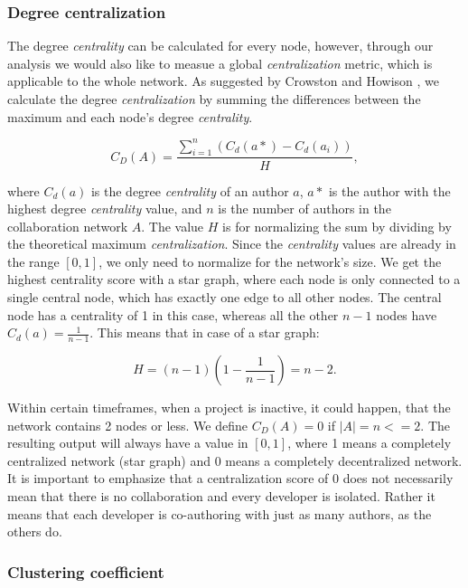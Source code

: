 \subsubsection{Degree centralization}

The degree \textit{centrality} can be calculated for every node, however, through our analysis we would also like to measue a global \textit{centralization} metric, which is applicable to the whole network. As suggested by Crowston and Howison \cite{crowstonHierarchyCentralizationFree2006}, we calculate the degree \textit{centralization} by summing the differences between the maximum and each node's degree \textit{centrality}. 

\[ C_D(A) = \frac{\sum_{i=1}^n(C_d(a*)-C_d(a_i))}{H}, \]

where $C_d(a)$ is the degree \textit{centrality} of an author $a$, $a*$ is the author with the highest degree \textit{centrality} value, and $n$ is the number of authors in the collaboration network $A$. The value $H$ is for normalizing the sum by dividing by the theoretical maximum \textit{centralization}. Since the \textit{centrality} values are already in the range $[0, 1]$, we only need to normalize for the network's size. We get the highest centrality score with a star graph, where each node is only connected to a single central node, which has exactly one edge to all other nodes. The central node has a centrality of 1 in this case, whereas all the other $n-1$ nodes have $C_d(a) = \frac{1}{n-1}$. This means that in case of a star graph:

\[ H = (n-1) (1-\frac{1}{n-1}) = n-2. \]

Within certain timeframes, when a project is inactive, it could happen, that the network contains 2 nodes or less. We define $C_D(A) = 0$ if $|A| = n <=2$. The resulting output will always have a value in $[0, 1]$, where 1 means a completely centralized network (star graph) and 0 means a completely decentralized network. It is important to emphasize that a centralization score of 0 does not necessarily mean that there is no collaboration and every developer is isolated. Rather it means that each developer is co-authoring with just as many authors, as the others do. \\



\subsubsection{Clustering coefficient}

